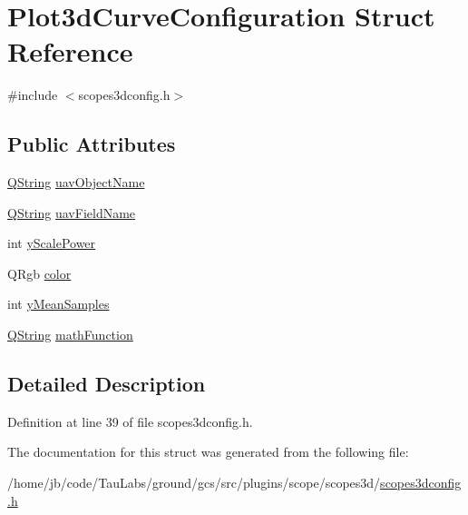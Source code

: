 \hypertarget{struct_plot3d_curve_configuration}{\section{\-Plot3d\-Curve\-Configuration \-Struct \-Reference}
\label{struct_plot3d_curve_configuration}
}


{\ttfamily \#include $<$scopes3dconfig.\-h$>$}

\subsection*{\-Public \-Attributes}
\begin{DoxyCompactItemize}
\item 
\hyperlink{group___u_a_v_objects_plugin_gab9d252f49c333c94a72f97ce3105a32d}{\-Q\-String} \hyperlink{group___scope_plugin_gae997da1be9b0e82a84d8d19292c28984}{uav\-Object\-Name}
\item 
\hyperlink{group___u_a_v_objects_plugin_gab9d252f49c333c94a72f97ce3105a32d}{\-Q\-String} \hyperlink{group___scope_plugin_ga16c893aa5d7da613ba51f6bd7bf70fc8}{uav\-Field\-Name}
\item 
int \hyperlink{group___scope_plugin_gafedb70e83328587c7a6e336f7899a247}{y\-Scale\-Power}
\item 
\-Q\-Rgb \hyperlink{group___scope_plugin_gab12e6f531f6e4242ccbb585aec40b245}{color}
\item 
int \hyperlink{group___scope_plugin_ga917daaa3cc944ff8bd9e8ae6ed1cfc3b}{y\-Mean\-Samples}
\item 
\hyperlink{group___u_a_v_objects_plugin_gab9d252f49c333c94a72f97ce3105a32d}{\-Q\-String} \hyperlink{group___scope_plugin_ga344f163230a632804af76085d5ed4ae1}{math\-Function}
\end{DoxyCompactItemize}


\subsection{\-Detailed \-Description}


\-Definition at line 39 of file scopes3dconfig.\-h.



\-The documentation for this struct was generated from the following file\-:\begin{DoxyCompactItemize}
\item 
/home/jb/code/\-Tau\-Labs/ground/gcs/src/plugins/scope/scopes3d/\hyperlink{scopes3dconfig_8h}{scopes3dconfig.\-h}\end{DoxyCompactItemize}
